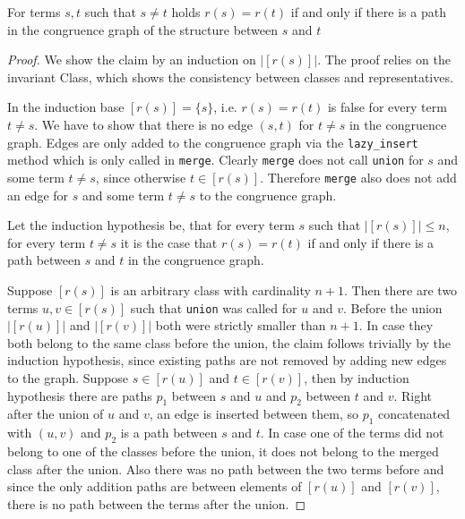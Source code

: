 \begin{invariant}[Paths]

For terms $s, t$ such that $s \neq t$ holds $r(s) = r(t)$ if and only if there is a path in the congruence graph of the structure between $s$ and $t$

\end{invariant}

\begin{proof}

We show the claim by an induction on $|[r(s)]|$.
The proof relies on the invariant Class, which shows the consistency between classes and representatives.

In the induction base $[r(s)] = \{s\}$, i.e. $r(s) = r(t)$ is false for every term $t \neq s$.
We have to show that there is no edge $(s,t)$ for $t \neq s$ in the congruence graph.
Edges are only added to the congruence graph via the \texttt{lazy\_insert} method which is only called in \texttt{merge}.
Clearly \texttt{merge} does not call \texttt{union} for $s$ and some term $t \neq s$, since otherwise $t \in [r(s)]$.
Therefore \texttt{merge} also does not add an edge for $s$ and some term $t \neq s$ to the congruence graph.

Let the induction hypothesis be, that for every term $s$ such that $|[r(s)]| \leq n$, for every term $t \neq s$ it is the case that $r(s) = r(t)$ if and only if there is a path between $s$ and $t$ in the congruence graph.

Suppose $[r(s)]$ is an arbitrary class with cardinality $n+1$.
Then there are two terms $u,v \in [r(s)]$ such that \texttt{union} was called for $u$ and $v$.
Before the union $|[r(u)]|$ and $|[r(v)]|$ both were strictly smaller than $n+1$.
In case they both belong to the same class before the union, the claim follows trivially by the induction hypothesis, since existing paths are not removed by adding new edges to the graph.
Suppose $s \in [r(u)]$ and $t \in [r(v)]$, then by induction hypothesis there are paths $p_1$ between $s$ and $u$ and $p_2$ between $t$ and $v$.
Right after the union of $u$ and $v$, an edge is inserted between them, so $p_1$ concatenated with $(u,v)$ and $p_2$ is a path between $s$ and $t$.
In case one of the terms did not belong to one of the classes before the union, it does not belong to the merged class after the union.
Also there was no path between the two terms before and since the only addition paths are between elements of $[r(u)]$ and $[r(v)]$, there is no path between the terms after the union.

\end{proof}

